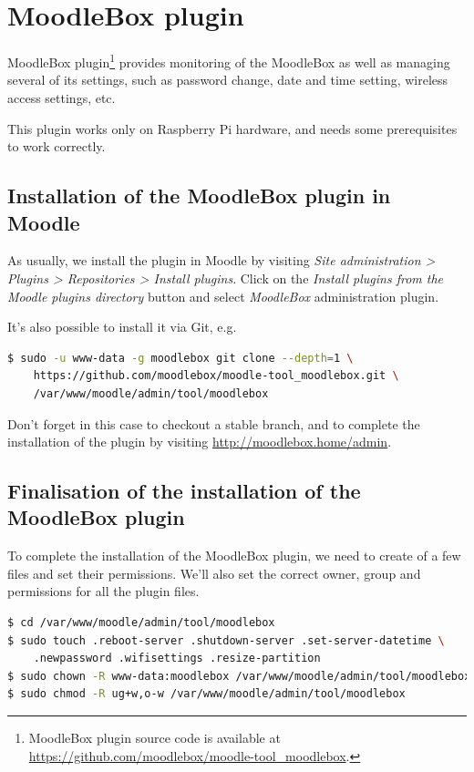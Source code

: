 \documentclass[12pt]{article}
\begin{document}

\section{MoodleBox plugin}

MoodleBox plugin\footnote{MoodleBox plugin source code is available at \url{https://github.com/moodlebox/moodle-tool_moodlebox}.} provides monitoring of the MoodleBox as well as managing several of its settings, such as password change, date and time setting, wireless access settings, etc.

This plugin works only on Raspberry Pi hardware, and needs some prerequisites to work correctly.

\subsection{Installation of the MoodleBox plugin in Moodle}

As usually, we install the plugin in Moodle by visiting \emph{Site administration > Plugins > Repositories > Install plugins}.
Click on the \emph{Install plugins from the Moodle plugins directory} button and select \emph{MoodleBox} administration plugin.

It's also possible to install it via Git, e.g.

\begin{lstlisting}[language=bash]
$ sudo -u www-data -g moodlebox git clone --depth=1 \
    https://github.com/moodlebox/moodle-tool_moodlebox.git \
    /var/www/moodle/admin/tool/moodlebox
\end{lstlisting}

Don't forget in this case to checkout a stable branch, and to complete the installation of the plugin by visiting \url{http://moodlebox.home/admin}.

\subsection{Finalisation of the installation of the MoodleBox plugin}

To complete the installation of the MoodleBox plugin, we need to create of a few files and set their permissions.
We'll also set the correct owner, group and permissions for all the plugin files.
\begin{lstlisting}[language=bash]
$ cd /var/www/moodle/admin/tool/moodlebox
$ sudo touch .reboot-server .shutdown-server .set-server-datetime \
    .newpassword .wifisettings .resize-partition
$ sudo chown -R www-data:moodlebox /var/www/moodle/admin/tool/moodlebox
$ sudo chmod -R ug+w,o-w /var/www/moodle/admin/tool/moodlebox
\end{lstlisting}
\end{document}
